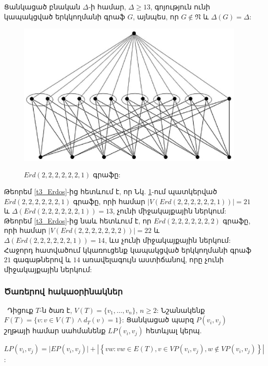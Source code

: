 \begin{corollary}
\label{c3_Erdos} Ցանկացած բնական $\Delta$-ի համար, $\Delta \geq 13$,
գոյություն ունի կապակցված երկկողմանի գրաֆ $G$, այնպես, որ $G\notin \mathfrak{N}$
և $\Delta(G)=\Delta$:
\end{corollary}

\begin{figure}[h]
\begin{center}
\includegraphics[width=30pc]{figures/erd6x2_1.eps}\\
\caption{$Erd(2,2,2,2,2,2,1)$ գրաֆը:}\label{f3_Erd6x2_1}
\end{center}
\end{figure}

Թեորեմ \ref{t3_Erdos}-ից հետևում է, որ Նկ. \ref{f3_Erd6x2_1}-ում պատկերված
$Erd(2,2,2,2,2,2,1)$ գրաֆը, որի համար $\vert V(Erd(2,2,2,2,2,2,1))\vert = 21$
և $\Delta(Erd(2,2,2,2,2,2,1))= 13$, չունի միջակայքային ներկում:
Թեորեմ \ref{t3_Erdos}-ից նաև հետևում է, որ $Erd(2,2,2,2,2,2,2)$ գրաֆը, որի համար $\vert
V(Erd(2,2,2,2,2,2,2))\vert =22$ և $\Delta(Erd(2,2,2,2,2,2,1)) =14$, ևս չունի միջակայքային ներկում:
Հաջորդ հատվածում կկառուցենք կապակցված երկկողմանի գրաֆ $21$ գագաթներով և $14$ առավելագույն աստիճանով, որը չունի միջակայքային ներկում:





\subsubsection{Ծառերով հակաօրինակներ}\
Դիցուք $T$-ն ծառ է, $V(T)=\{v_{1},\ldots,v_{n}\}$, $n\geq 2$:
Նշանակենք $F(T)=\{v:v\in V(T)\wedge d_{T}(v)=1\}$: Ցանկացած պարզ 
$P(v_{i},v_{j})$ շղթայի համար սահմանենք $LP(v_{i},v_{j})$ հետևյալ կերպ.
\begin{center}
$LP(v_{i},v_{j})=\vert EP(v_{i},v_{j})\vert + \left|\left\{vw:vw\in
E(T), v\in VP(v_{i},v_{j}), w\notin VP(v_{i},v_{j})\right\}\right|$:
\end{center}

